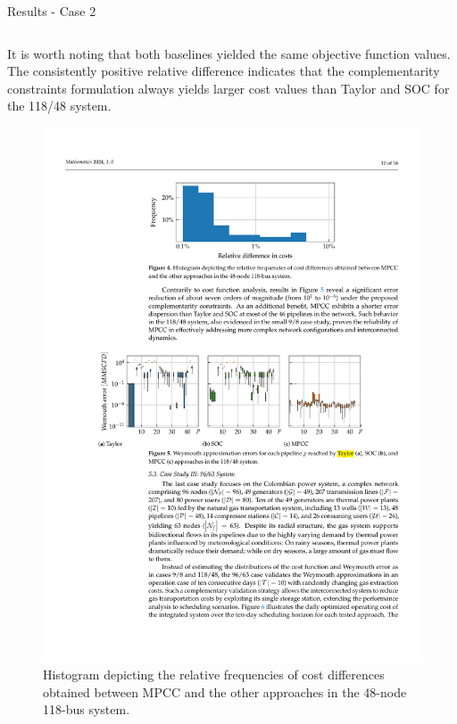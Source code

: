 \documentclass[hyperref={colorlinks,citecolor=blue,linkcolor=blue,urlcolor=blue}]{beamer}
\newlength\figureheight
\newlength\figurewidth
\begin{document}
\begin{frame}{Results - Case 2}
\scriptsize
\begin{columns}[t,onlytextwidth]
    \begin{column}{0.44\textwidth}
        It is worth noting that both baselines yielded the same objective function values. The consistently positive relative difference indicates that the complementarity constraints formulation always yields larger cost values than Taylor and SOC for the 118/48 system.
        
        
        \begin{figure}[H]
            \centering
            \setlength{}        
            \setlength{}
            \includegraphics[width=\figurewidth, height=\figureheight]{figures/case2_cost.pdf} 
            \caption{\scriptsize Histogram depicting the relative frequencies of cost differences obtained between MPCC and the other approaches in the 48-node 118-bus system.}
            \label{fig:green_test_cost}
        \end{figure}
    \end{column}
    

\end{columns}
\end{frame}
\end{document}
